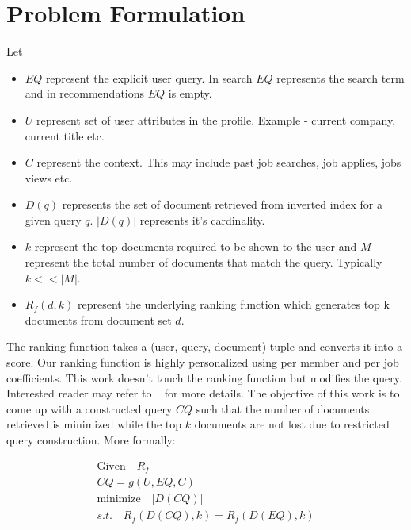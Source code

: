 \documentclass[sigconf]{acmart}
\begin{document}
\section{Problem Formulation}
Let
\begin{itemize}
    \item $EQ$ represent the explicit user query. In search $EQ$ represents the
        search term and in recommendations $EQ$ is empty.
    \item $U$ represent set of user attributes in the profile. Example -
        current company, current title etc.
    \item $C$ represent the context. This may include past job searches,
        job applies, jobs views etc.
    \item $D(q)$ represents the set of document retrieved from inverted index
        for a given query $q$. $|D(q)|$ represents it's cardinality.
    \item $k$ represent the top documents required to be shown to the user and
        $M$ represent the total number of documents that match the query.
        Typically $k << |M|$.
    \item $R_f(d, k)$ represent the underlying ranking function which generates
        top k documents from document set $d$.  

\end{itemize}
The ranking function takes a (user, query, document) tuple and converts it into a score. Our
ranking function is highly personalized using per member and per job
coefficients. This work doesn't touch the ranking function but modifies the query. 
Interested reader may refer to ~\cite{zhang2016glmix, liget} for more details. The
objective of this work is to come up with a constructed query $CQ$
such that the number of documents retrieved is minimized while the top $k$ documents are not
lost due to restricted query construction. More formally:

\begin{equation} \label{eq:problem-formulation}
    \begin{aligned}
        \textrm{Given} \quad R_f \\
    CQ = g(U, EQ, C) \\
        \textrm{minimize} \quad |D(CQ)| \\
        s. t. \quad  R_f(D(CQ), k) = R_f(D(EQ), k)
    \end{aligned}
\end{equation}
\end{document}
